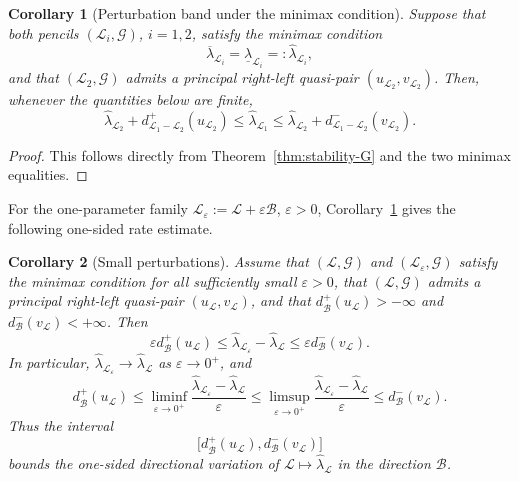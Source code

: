 \documentclass[preprint,10pt]{elsarticle}
\theoremstyle{plain}
\newtheorem{corollary}{Corollary}
\theoremstyle{definition}
\theoremstyle{remark}
\begin{document}
\begin{corollary}[Perturbation band under the minimax condition]
	\label{cor:band-G}
	Suppose that both pencils \((\mathcal L_i,\mathcal G)\), \(i=1,2\), satisfy
	the minimax condition
	\[
	\overline\lambda_{\mathcal L_i}
	=
	\underline\lambda_{\mathcal L_i}
	=:
	\hat\lambda_{\mathcal L_i},
	\]
	and that \((\mathcal L_2,\mathcal G)\) admits a principal right-left
	quasi-pair \((u_{\mathcal L_2},v_{\mathcal L_2})\). Then, whenever the
	quantities below are finite,
	\begin{equation}\label{eq:band-final-G}
		\hat\lambda_{\mathcal L_2}
		+
		d^+_{\mathcal L_1-\mathcal L_2}(u_{\mathcal L_2})
		\le
		\hat\lambda_{\mathcal L_1}
		\le
		\hat\lambda_{\mathcal L_2}
		+
		d^-_{\mathcal L_1-\mathcal L_2}(v_{\mathcal L_2}).
	\end{equation}
\end{corollary}

\begin{proof}
	This follows directly from Theorem~\ref{thm:stability-G} and the two
	minimax equalities.
\end{proof}

For the one-parameter family
\(\mathcal L_\varepsilon:=\mathcal L+\varepsilon\mathcal B\),
\(\varepsilon>0\), Corollary~\ref{cor:band-G} gives the following
one-sided rate estimate.

\begin{corollary}[Small perturbations]
	\label{cor:stability_eps}
	Assume that \((\mathcal L,\mathcal G)\) and
	\((\mathcal L_\varepsilon,\mathcal G)\) satisfy the minimax condition for all
	sufficiently small \(\varepsilon>0\), that \((\mathcal L,\mathcal G)\) admits a
	principal right-left quasi-pair \((u_{\mathcal L},v_{\mathcal L})\), and that
	\(d^+_{\mathcal B}(u_{\mathcal L})>-\infty\) and
	\(d^-_{\mathcal B}(v_{\mathcal L})<+\infty\). Then
	\begin{equation}\label{eq:eps_bounds}
		\varepsilon d^+_{\mathcal B}(u_{\mathcal L})
		\le
		\hat\lambda_{\mathcal L_\varepsilon}
		-
		\hat\lambda_{\mathcal L}
		\le
		\varepsilon d^-_{\mathcal B}(v_{\mathcal L}).
	\end{equation}
	In particular,
	\(\hat\lambda_{\mathcal L_\varepsilon}\to\hat\lambda_{\mathcal L}\) as
	\(\varepsilon\to0^+\), and
	\[
	d^+_{\mathcal B}(u_{\mathcal L})
	\le
	\liminf_{\varepsilon\to0^+}
	\frac{\hat\lambda_{\mathcal L_\varepsilon}-\hat\lambda_{\mathcal L}}
	{\varepsilon}
	\le
	\limsup_{\varepsilon\to0^+}
	\frac{\hat\lambda_{\mathcal L_\varepsilon}-\hat\lambda_{\mathcal L}}
	{\varepsilon}
	\le
	d^-_{\mathcal B}(v_{\mathcal L}).
	\]
	Thus the interval
	\[
	\bigl[
	d^+_{\mathcal B}(u_{\mathcal L}),
	d^-_{\mathcal B}(v_{\mathcal L})
	\bigr]
	\]
	bounds the one-sided directional variation of
	\(\mathcal L\mapsto\hat\lambda_{\mathcal L}\) in the direction
	\(\mathcal B\).
\end{corollary}
\end{document}
